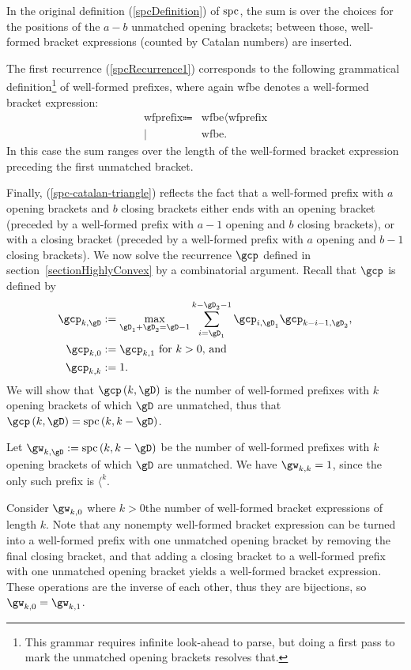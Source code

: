 In the original definition (\ref{spcDefinition}) of $\operatorname{spc}$, the sum is over the choices for the positions of the
$a-b$ unmatched opening brackets; between those, well-formed bracket expressions (counted by Catalan numbers) are
inserted.

The first recurrence (\ref{spcRecurrence1}) corresponds to the following grammatical
definition\footnote{This grammar requires infinite look-ahead to parse, but doing a first pass to mark the
unmatched opening brackets resolves that.} of well-formed
prefixes, where again wfbe denotes a well-formed bracket expression:
\begin{align*}
\text{wfprefix} \Coloneq
& \text{wfbe} \langle \text{wfprefix} \\
\mid\: & \text{wfbe}.
\end{align*}
In this case the sum ranges over the length of the well-formed bracket expression preceding the first unmatched bracket.

Finally, (\ref{spc-catalan-triangle}) reflects the fact that a well-formed prefix with $a$ opening brackets
and $b$ closing brackets either ends with an opening bracket (preceded by a well-formed prefix with $a-1$ opening
and $b$ closing brackets), or with a closing bracket (preceded by a well-formed prefix with $a$ opening
and $b-1$ closing brackets).
\label{tyingLooseEnds}
We now solve the recurrence $\gcp$ defined in section~\ref{sectionHighlyConvex} by a combinatorial argument.
Recall that $\gcp$ is defined by
\begin{align*}
\gcp_{k,\gD}&\DefineAs\max_{\gD_1+\gD_2=\gD-1}\sum{i=\gD_1}[k-\gD_2-1]\gcp_{i,\gD_1}\gcp_{k-i-1,\gD_2}\text,\\
\gcp_{k,0}&\DefineAs\gcp_{k,1}\text{ for $k>0$, and}\\
\gcp_{k,k}&\DefineAs1\text.
\end{align*}
We will show that $\gcp\of{k,\gD}$ is the number of well-formed prefixes with $k$ opening brackets of which $\gD$
are unmatched, thus that $\gcp\of{k,\gD}=\spc\of{k,k-\gD}$.

Let $\gw_{k,\gD}\DefineAs\spc\of{k,k-\gD}$ be the number of well-formed prefixes with $k$ opening brackets of which $\gD$
are unmatched.
We have $\gw_{k,k}=1$, since the only such prefix is $\langle^k$.

Consider $\gw_{k,0}$ where $k>0$\idest the number of well-formed bracket expressions of length $k$. Note that any
nonempty well-formed bracket expression can be turned into a well-formed prefix with one unmatched opening bracket
by removing the final closing bracket, and that adding a closing bracket to a well-formed prefix with
one unmatched opening bracket yields a well-formed bracket expression. These operations are the inverse of each other,
thus they are bijections, so $\gw_{k,0}=\gw_{k,1}$.

